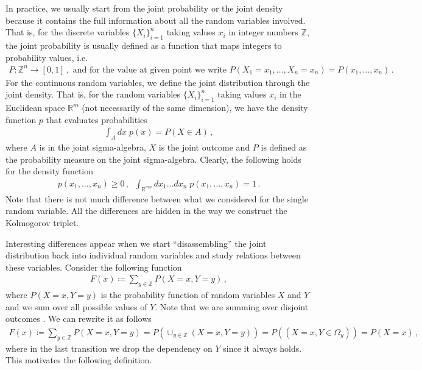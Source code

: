 In practice, we usually start from the joint probability or the joint density because it contains the full information about all the random variables involved.
That is, for the discrete variables $\{X_i\}_{i=1}^n$ taking values $x_i$ in integer numbers $\mathbb{Z}$, the joint probability is usually defined as a function that maps integers to probability values, i.e.
\begin{align}
    P: \mathbb{Z}^n \to [0,1]\,, \text{ and for the value at given point we write } P(X_1 = x_1, \ldots, X_n = x_n) = P(x_1, \ldots, x_n)\,.
\end{align}
For the continuous random variables, we define the joint distribution through the joint density. 
That is, for the random variables $\{X_i\}_{i=1}^n$ taking values $x_i$ in the Euclidean space $\mathbb{R}^m$ (not necessarily of the same dimension), we have the density function $p$ that evaluates probabilities
\begin{align}
    \int_A dx\; p(x) = P(X \in A)\,,
\end{align}
where $A$ is in the joint sigma-algebra, $X$ is the joint outcome and $P$ is defined as the probability measure on the joint sigma-algebra.
Clearly, the following holds for the density function
\begin{align}
    p(x_1,\ldots, x_n) \geq 0\,, \;\; \int_{\mathbb{R}^{mn}} dx_1\ldots dx_n\; p(x_1,\ldots,x_n) = 1\,.
\end{align}
Note that there is not much difference between what we considered for the single random variable.
All the differences are hidden in the way we construct the Kolmogorov triplet.

Interesting differences appear when we start ``disassembling'' the joint distribution back into individual random variables and study relations between these variables.
Consider the following function
\begin{align}
    F(x) \coloneqq \sum_{y \in \mathbb{Z}} P(X = x, Y = y)\,,
\end{align}
where $P(X = x, Y = y)$ is the probability function of random variables $X$ and $Y$ and we sum over all possible values of $Y$.
Note that we are summing over disjoint outcomes .
We can rewrite it as follows
\begin{align}
    F(x) \coloneqq \sum_{y \in \mathbb{Z}} P(X = x, Y = y) = P(\cup_{y \in \mathbb{Z}} (X = x, Y = y)) = P((X = x, Y \in \Omega_y)) = P(X = x)\,,
\end{align}
where in the last transition we drop the dependency on $Y$ since it always holds.
This motivates the following definition.

